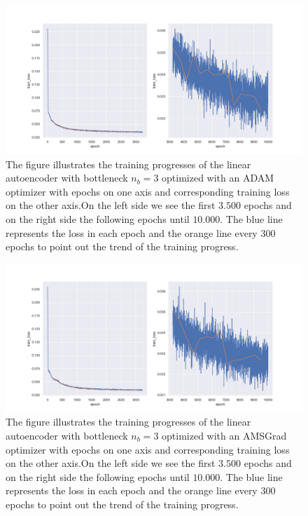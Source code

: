 \begin{figure}
\begin{center}
\includegraphics[width=\linewidth]{linear_AE_3d_adam_training_progress}
\end{center}
\caption{The figure illustrates the training progresses of the linear autoencoder with bottleneck $n_b=3$ optimized with an ADAM optimizer with epochs on one axis and corresponding training loss on the other axis.On the left side we see the first $3.500$ epochs and on the right side the following epochs until $10.000$. The blue line represents the loss in each epoch and the orange line every $300$ epochs to point out the trend of the training progress.}\label{fig:linear_AE_3d_adam_training_progress}
\end{figure}


\begin{figure}
\begin{center}
\includegraphics[width=\linewidth]{linear_AE_3d_amsgrad_training_progress}
\end{center}
\caption{The figure illustrates the training progresses of the linear autoencoder with bottleneck $n_b=3$ optimized with an AMSGrad optimizer with epochs on one axis and corresponding training loss on the other axis.On the left side we see the first $3.500$ epochs and on the right side the following epochs until $10.000$. The blue line represents the loss in each epoch and the orange line every $300$ epochs to point out the trend of the training progress.}\label{fig:linear_AE_3d_amsgrad_training_progress}
\end{figure}


